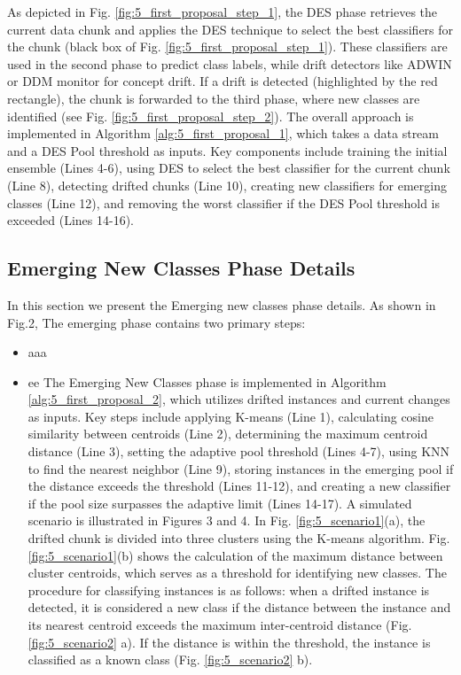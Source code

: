 As depicted in Fig. \ref{fig:5_first_proposal_step_1}, the DES phase retrieves the current data chunk and applies the DES technique to select the best classifiers for the chunk (black box of Fig.  \ref{fig:5_first_proposal_step_1}). These classifiers are used in the second phase to predict class labels, while drift detectors like ADWIN or DDM monitor for concept drift. If a drift is detected (highlighted by the red rectangle), the chunk is forwarded to the third phase, where new classes are identified (see Fig.  \ref{fig:5_first_proposal_step_2}). The overall approach is implemented in Algorithm  \ref{alg:5_first_proposal_1}, which takes a data stream and a DES Pool threshold as inputs. Key components include training the initial ensemble (Lines 4-6), using DES to select the best classifier for the current chunk (Line 8), detecting drifted chunks (Line 10), creating new classifiers for emerging classes (Line 12), and removing the worst classifier if the DES Pool threshold is exceeded (Lines 14-16).


\subsection{Emerging New Classes Phase Details}

In this section we present the Emerging new classes phase details. As shown in Fig.2, The emerging phase contains two primary steps: 
\begin{itemize}
	\item aaa 
	\item ee
	The Emerging New Classes phase is implemented in Algorithm  \ref{alg:5_first_proposal_2}, which utilizes drifted instances and current changes as inputs. Key steps include applying K-means (Line 1), calculating cosine similarity between centroids (Line 2), determining the maximum centroid distance (Line 3), setting the adaptive pool threshold (Lines 4-7), using KNN to find the nearest neighbor (Line 9), storing instances in the emerging pool if the distance exceeds the threshold (Lines 11-12), and creating a new classifier if the pool size surpasses the adaptive limit (Lines 14-17). A simulated scenario is illustrated in Figures 3 and 4. In Fig. \ref{fig:5_scenario1}(a), the drifted chunk is divided into three clusters using the K-means algorithm. Fig. \ref{fig:5_scenario1}(b) shows the calculation of the maximum distance between cluster centroids, which serves as a threshold for identifying new classes. The procedure for classifying instances is as follows: when a drifted instance is detected, it is considered a new class if the distance between the instance and its nearest centroid exceeds the maximum inter-centroid distance (Fig. \ref{fig:5_scenario2} a). If the distance is within the threshold, the instance is classified as a known class (Fig. \ref{fig:5_scenario2} b).
\end{itemize}

